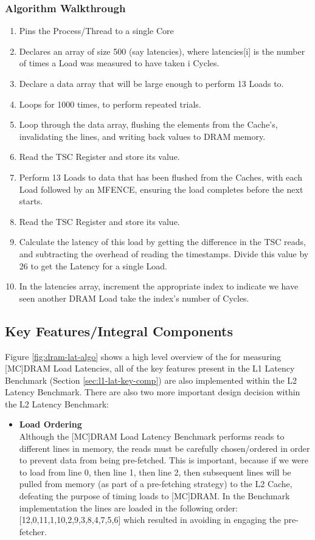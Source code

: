 \documentclass[bsc,frontabs,twoside,singlespacing,parskip,deptreport]{infthesis}     %
\begin{document}
\subsubsection{Algorithm Walkthrough}
\begin{enumerate}
    \item Pins the Process/Thread to a single Core
    \item Declares an array of size 500 (say latencies), where latencies[i] is the number of times a Load was measured to have taken i Cycles.
    \item Declare a data array that will be large enough to perform 13 Loads to.
    \item Loops for 1000 times, to perform repeated trials.
    \item Loop through the data array, flushing the elements from the Cache's, invalidating the lines, and writing back values to DRAM memory.
    \item Read the TSC Register and store its value.
    \item Perform 13 Loads to data that has been flushed from the Caches, with each Load followed by an MFENCE\cite{mfence_spec}, ensuring the load completes before the next starts.
    \item Read the TSC Register and store its value.
    \item Calculate the latency of this load by getting the difference in the TSC reads, and subtracting the overhead of reading the timestamps. Divide this value by 26 to get the Latency for a single Load.
    \item In the latencies array, increment the appropriate index to indicate we have seen another DRAM Load take the index's number of Cycles.
\end{enumerate}
\subsection{Key Features/Integral Components}\label{sec:mem-lat-key-comp}
Figure \ref{fig:dram-lat-algo} shows a high level overview of the for measuring [MC]DRAM Load Latencies, all of the key features present in the L1 Latency Benchmark (Section \ref{sec:l1-lat-key-comp}) are also implemented within the L2 Latency Benchmark. There are also two more important design decision within the L2 Latency Benchmark:
\begin{itemize}
    \item{{\bf Load Ordering} \\
    Although the [MC]DRAM Load Latency Benchmark performs reads to different lines in memory, the reads must be carefully chosen/ordered in order to prevent data from being pre-fetched. This is important, because if we were to load from line 0, then line 1, then line 2, then subsequent lines will be pulled from memory (as part of a pre-fetching strategy) to the L2 Cache, defeating the purpose of timing loads to [MC]DRAM. In the Benchmark implementation the lines are loaded in the following order: [12,0,11,1,10,2,9,3,8,4,7,5,6] which resulted in avoiding in engaging the pre-fetcher}.
\end{itemize}
\end{document}
